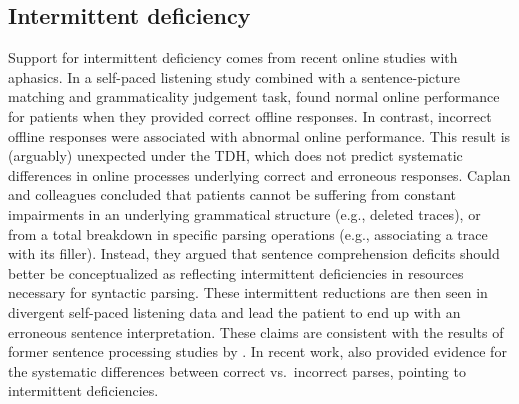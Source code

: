 \documentclass{cambridge7A}\usepackage[]{graphicx}\usepackage[]{color}
\begin{document}
\subsection{Intermittent deficiency}
Support for intermittent deficiency comes from recent online studies with aphasics. In a self-paced listening study combined with a sentence-picture matching and grammaticality judgement task, \cite{Caplan:2007} found normal online performance for patients when they provided correct offline responses. In contrast, incorrect offline responses were associated with abnormal online performance. This result is (arguably) unexpected under the TDH, which does not predict systematic differences in online processes underlying correct and erroneous responses. Caplan and colleagues concluded that patients cannot be suffering from constant impairments in an underlying grammatical structure (e.g., deleted traces), or from a total breakdown in specific parsing operations (e.g., associating a trace with its filler). Instead, they argued that sentence comprehension deficits should better be conceptualized as reflecting intermittent deficiencies in resources necessary for syntactic parsing. These intermittent reductions are then seen in divergent self-paced listening data and lead the patient to end up with an erroneous sentence interpretation. These claims are consistent with the results of former sentence processing studies by \cite{Caplan:2003,Caplan:1995}.
In recent work, \cite{hanneetal11} also provided evidence for the systematic differences between correct vs.\ incorrect parses, pointing to intermittent deficiencies.
\end{document}
